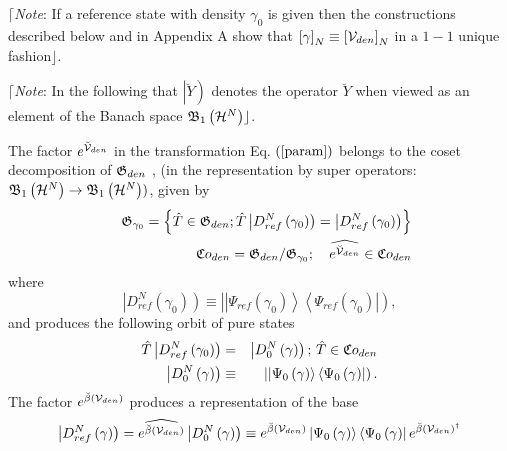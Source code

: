 $\lceil ${\em Note}: If a reference state with density $\gamma _{0}$ is
given then the constructions described below and in Appendix A show that $%
\left[ \gamma \right] _{N}\equiv \left[ {\cal V}_{den}\right] _{N}$ in a $%
1-1 $ unique fashion$\rfloor $.

$\lceil ${\em Note}: In the following that $\left| \breve{Y}\right) $
denotes the operator $\breve{Y}$ when viewed as an element of the Banach
space ${\frak B}_{1}\left( {\cal H}^{N}\right) \rfloor $.

The factor $e^{{\cal \breve{V}}_{den}}$ in the transformation Eq. $\left( %
\ref{param}\right) $ belongs to the coset decomposition of ${\frak G}_{den}$%
, (in the representation by super operators: ${\frak B}_{1}\left( {\cal H}%
^{N}\right) \rightarrow {\frak B}_{1}\left( {\cal H}^{N}\right) )$, given by 
\begin{eqnarray}
&&{\frak G}_{\gamma _{0}}=\left\{ \hat{T}\in {\frak G}_{den}{\frak ;\,}\hat{T%
}\left| D_{ref}^{N}\left( \gamma _{0}\right) \right) =\left|
D_{ref}^{N}\left( \gamma _{0}\right) \right) \right\}  \nonumber \\
&&{\frak Co}_{den}={\frak G}_{den}/{\frak G}_{\gamma _{0}};\quad \widehat{e^{%
{\cal \breve{V}}_{den}}}\in {\frak Co}_{den}
\end{eqnarray}%
where 
\begin{equation}
\left| D_{ref}^{N}\left( \gamma _{0}\right) \right) \equiv \left| \left|
\Psi _{ref}\left( \gamma _{0}\right) \right\rangle \left\langle \Psi
_{ref}\left( \gamma _{0}\right) \right| \right) ,
\end{equation}%
and produces the following orbit of pure states 
\begin{eqnarray}
\hat{T}\left| D_{ref}^{N}\left( \gamma _{0}\right) \right) &=&\left|
D_{0}^{N}\left( \gamma \right) \right) ;\,\hat{T}\in {\frak Co}_{den} 
\nonumber \\
\left| D_{0}^{N}\left( \gamma \right) \right) &\equiv &\left| \left| \Psi
_{0}\left( \gamma \right) \right\rangle \left\langle \Psi _{0}\left( \gamma
\right) \right| \right) .
\end{eqnarray}%
The factor $e^{{\cal \breve{\beta}}\left( {\cal V}_{den}\right) }$ produces
a representation of the base 
\begin{equation}
\left| D_{ref}^{N}\left( \gamma \right) \right) =\widehat{e^{{\cal \breve{%
\beta}}\left( {\cal V}_{den}\right) }}\left| D_{0}^{N}\left( \gamma \right)
\right) \equiv e^{{\cal \breve{\beta}}\left( {\cal V}_{den}\right) }\left|
\Psi _{0}\left( \gamma \right) \right\rangle \left\langle \Psi _{0}\left(
\gamma \right) \right| e^{{\cal \breve{\beta}}\left( {\cal V}_{den}\right)
^{\dagger }}
\end{equation}%
